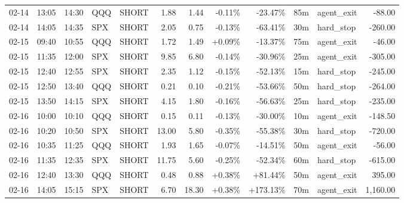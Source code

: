 \documentclass[11pt,a4paper,twoside]{article}
\begin{document}
\begin{center}
\begin{longtable}{>{\color{txtmain}}l l l l l r r r r r >{\color{txtmain}}l r}
02-14 & 13:05 & 14:30 & QQQ & SHORT & 1.88 & 1.44 & \textcolor{lossred}{-0.11\%} & \textcolor{lossred}{-23.47\%} & 85m & agent\_exit & \textcolor{lossred}{-88.00} \\
02-14 & 14:05 & 14:35 & SPX & SHORT & 2.05 & 0.75 & \textcolor{lossred}{-0.13\%} & \textcolor{lossred}{-63.41\%} & 30m & hard\_stop & \textcolor{lossred}{-260.00} \\
02-15 & 09:40 & 10:55 & QQQ & SHORT & 1.72 & 1.49 & \textcolor{wingreen}{+0.09\%} & \textcolor{lossred}{-13.37\%} & 75m & agent\_exit & \textcolor{lossred}{-46.00} \\
02-15 & 11:35 & 12:00 & SPX & SHORT & 9.85 & 6.80 & \textcolor{lossred}{-0.14\%} & \textcolor{lossred}{-30.96\%} & 25m & agent\_exit & \textcolor{lossred}{-305.00} \\
02-15 & 12:40 & 12:55 & SPX & SHORT & 2.35 & 1.12 & \textcolor{lossred}{-0.15\%} & \textcolor{lossred}{-52.13\%} & 15m & hard\_stop & \textcolor{lossred}{-245.00} \\
02-15 & 12:50 & 13:40 & QQQ & SHORT & 0.21 & 0.10 & \textcolor{lossred}{-0.21\%} & \textcolor{lossred}{-53.66\%} & 50m & hard\_stop & \textcolor{lossred}{-264.00} \\
02-15 & 13:50 & 14:15 & SPX & SHORT & 4.15 & 1.80 & \textcolor{lossred}{-0.16\%} & \textcolor{lossred}{-56.63\%} & 25m & hard\_stop & \textcolor{lossred}{-235.00} \\
02-16 & 10:00 & 10:10 & QQQ & SHORT & 0.15 & 0.11 & \textcolor{lossred}{-0.13\%} & \textcolor{lossred}{-30.00\%} & 10m & agent\_exit & \textcolor{lossred}{-148.50} \\
02-16 & 10:20 & 10:50 & SPX & SHORT & 13.00 & 5.80 & \textcolor{lossred}{-0.35\%} & \textcolor{lossred}{-55.38\%} & 30m & hard\_stop & \textcolor{lossred}{-720.00} \\
02-16 & 10:35 & 11:25 & QQQ & SHORT & 1.93 & 1.65 & \textcolor{lossred}{-0.07\%} & \textcolor{lossred}{-14.51\%} & 50m & agent\_exit & \textcolor{lossred}{-56.00} \\
02-16 & 11:35 & 12:35 & SPX & SHORT & 11.75 & 5.60 & \textcolor{lossred}{-0.25\%} & \textcolor{lossred}{-52.34\%} & 60m & hard\_stop & \textcolor{lossred}{-615.00} \\
02-16 & 12:40 & 13:30 & QQQ & SHORT & 0.48 & 0.88 & \textcolor{wingreen}{+0.38\%} & \textcolor{wingreen}{+81.44\%} & 50m & agent\_exit & \textcolor{wingreen}{395.00} \\
02-16 & 14:05 & 15:15 & SPX & SHORT & 6.70 & 18.30 & \textcolor{wingreen}{+0.38\%} & \textcolor{wingreen}{+173.13\%} & 70m & agent\_exit & \textcolor{wingreen}{1,160.00} \\

\end{longtable}
\end{center}
\end{document}
